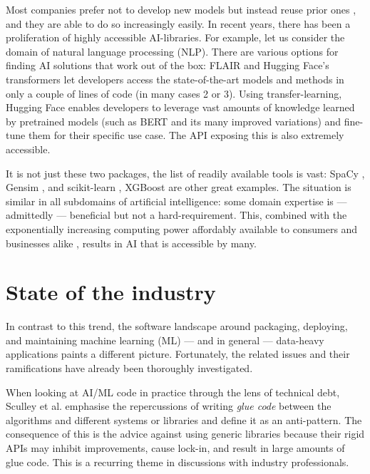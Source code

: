 Most companies prefer not to develop new models but instead reuse prior ones \cite{bosch2021engineering}, and they are able to do so increasingly easily. In recent years, there has been a proliferation of highly accessible AI-libraries. For example, let us consider the domain of natural language processing (NLP). There are various options for finding AI solutions that work out of the box: FLAIR \cite{akbik2019flair} and Hugging Face's transformers \cite{wolf2019huggingface} let developers access the state-of-the-art models and methods in only a couple of lines of code (in many cases 2 or 3). Using transfer-learning, Hugging Face enables developers to leverage vast amounts of knowledge learned by pretrained models (such as BERT \cite{devlin2018bert} and its many improved variations) and fine-tune them for their specific use case. The API exposing this is also extremely accessible.

It is not just these two packages, the list of readily available tools is vast: SpaCy \cite{srinivasa2018natural}, Gensim \cite{vrehuuvrek2011gensim}, and scikit-learn \cite{pedregosa2011scikit}, XGBoost \cite{Chen_2016} are other great examples. The situation is similar in all subdomains of artificial intelligence: some domain expertise is --- admittedly --- beneficial but not a hard-requirement. This, combined with the exponentially increasing computing power affordably available to consumers and businesses alike \cite{sun2019summarizing}, results in AI that is accessible by many.

\section{State of the industry} \label{section:industry}

In contrast to this trend, the software landscape around packaging, deploying, and maintaining machine learning (ML) --- and in general --- data-heavy applications paints a different picture. Fortunately, the related issues and their ramifications have already been thoroughly investigated.

When looking at AI/ML code in practice through the lens of technical debt, Sculley et al. \cite{sculley2015hidden} emphasise the repercussions of writing \textit{glue code} between the algorithms and different systems or libraries and define it as an anti-pattern. The consequence of this is the advice against using generic libraries because their rigid APIs may inhibit improvements, cause lock-in, and result in large amounts of glue code. This is a recurring theme in discussions with industry professionals.

